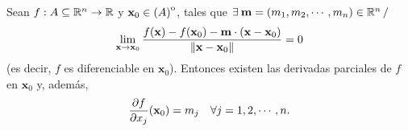 





\begin{theorem}\label{teo:difDer}Sean $f: A  \subseteq  \mathbb{R}^n \to \mathbb{R}$ y $\mathbf{x}_0 \in {\kern0pt(A)}^{\mathrm{o}}$, tales que $\exists\: \mathbf{m} = (m_1, m_2, \cdots, m_n) \in \mathbb{R}^n \, /$
\[
 \lim_{\mathbf{x} \to \mathbf{x}_0} \frac{f(\mathbf{x}) - f(\mathbf{x}_0) - \mathbf{m} \cdot (\mathbf{x} - \mathbf{x}_0)}
                                 {\norm{\mathbf{x} - \mathbf{x}_0}} = 0
\]
(es decir, $f$ es diferenciable en $\mathbf{x}_0$). Entonces existen las derivadas parciales de $f$ en $\mathbf{x}_0$ y, adem\'as,
\[
 \dfrac{\partial f}{\partial x_j} (\mathbf{x}_0) = m_j \quad \forall j = 1, 2, \cdots, n.
\]
\end{theorem}


